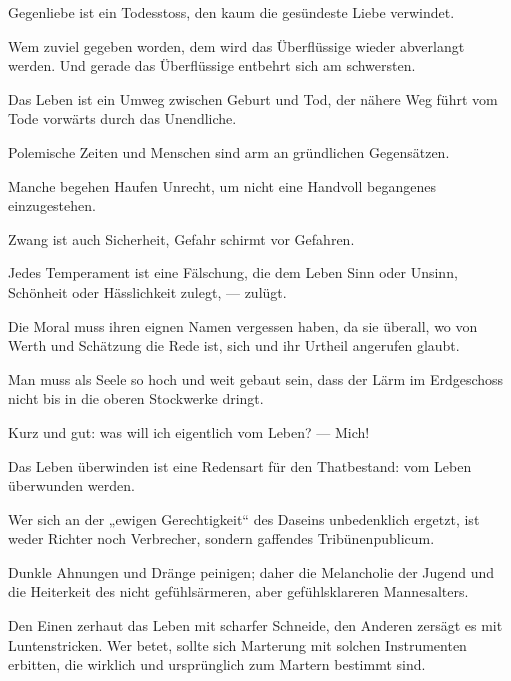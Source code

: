 Gegenliebe ist ein Todesstoss, den kaum die gesündeste Liebe verwindet.
\par

Wem zuviel gegeben worden, dem wird das Überflüssige wieder abverlangt werden. Und gerade das Überflüssige entbehrt sich am schwersten.
\par

Das Leben ist ein Umweg zwischen Geburt und Tod, der  nähere Weg führt vom Tode vorwärts durch das Unendliche.
\par

Polemische Zeiten und Menschen sind arm an gründlichen Gegensätzen.
\par

Manche begehen Haufen Unrecht, um nicht eine Handvoll begangenes einzugestehen.
\par

Zwang ist auch Sicherheit, Gefahr schirmt vor Gefahren.
\par

Jedes Temperament ist eine Fälschung, die dem Leben Sinn oder Unsinn, Schönheit oder Hässlichkeit zulegt, — zulügt.
\par

Die Moral muss ihren eignen Namen vergessen haben, da sie überall, wo von Werth und Schätzung die Rede ist, sich und ihr Urtheil angerufen glaubt.
\par

Man muss als Seele so hoch und weit gebaut sein, dass der Lärm im Erdgeschoss nicht bis in die oberen Stockwerke dringt.
\par

Kurz und gut: was will ich eigentlich vom Leben? — Mich!
\par

Das Leben überwinden ist eine Redensart für den Thatbestand: vom Leben überwunden werden.
\par

Wer sich an der „ewigen Gerechtigkeit“ des Daseins unbedenklich ergetzt, ist weder Richter noch Verbrecher, sondern gaffendes Tribünenpublicum.
\par

Dunkle Ahnungen und Dränge peinigen; daher die Melancholie der Jugend und die Heiterkeit des nicht gefühlsärmeren, aber gefühlsklareren Mannesalters.
\par

Den Einen zerhaut das Leben mit scharfer Schneide, den Anderen zersägt es mit Luntenstricken. Wer betet, sollte sich Marterung mit solchen Instrumenten erbitten, die wirklich und ursprünglich zum Martern bestimmt sind.
\par

